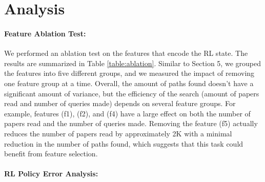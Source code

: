 

\section{Analysis}\label{sec:analysis}
\vspace{-2mm}
\paragraph{Feature Ablation Test:}

We performed an ablation test on the features that encode  the RL state. The results are summarized in Table \ref{table:ablation}. Similar to Section 5, we grouped the features into five different groups, and we measured the impact of removing one feature group at a time. Overall, the amount of paths found doesn't have a significant amount of variance, but the efficiency of the search (amount of papers read and number of queries made)  depends on several feature groups. 
For example, features (f1), (f2), and (f4) have a large effect on both the number of papers read and the number of queries made. 
Removing the feature (f5) actually reduces the number of papers read by approximately 2K with a minimal reduction in the number of paths found, which suggests that this task could benefit from feature selection. 



\paragraph{RL Policy Error Analysis:}

